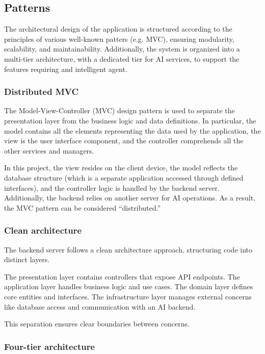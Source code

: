 \documentclass{article}
\begin{document}

\subsection{Patterns}

The architectural design of the application is structured according to the principles of various well-known patters (e.g. MVC), ensuring modularity, scalability, and maintainability.
Additionally, the system is organized into a multi-tier architecture, with a dedicated tier for AI services, to support the features requiring and intelligent agent.

\subsubsection{Distributed MVC}

The Model-View-Controller (MVC) design pattern is used to separate the presentation layer from the business logic and data definitions.
In particular, the model contains all the elements representing the data used by the application, the view is the user interface component, and the controller comprehends all the other services and managers.

In this project, the view resides on the client device, the model reflects the database structure (which is a separate application accessed through defined interfaces), and the controller logic is handled by the backend server.
Additionally, the backend relies on another server for AI operations.
As a result, the MVC pattern can be considered “distributed.”

\subsubsection{Clean architecture}

The backend server follows a clean architecture approach, structuring code into distinct layers.

The presentation layer contains controllers that expose API endpoints.
The application layer handles business logic and use cases.
The domain layer defines core entities and interfaces.
The infrastructure layer manages external concerns like database access and communication with an AI backend.

This separation ensures clear boundaries between concerns.

\subsubsection{Four-tier architecture}
\end{document}
